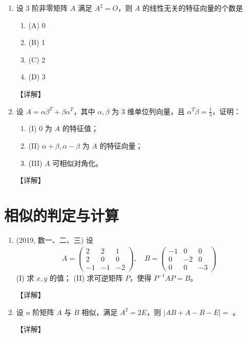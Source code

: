\documentclass[12pt, a4paper, oneside, UTF8]{ctexbook}
\begin{document}
\begin{enumerate}[label=\arabic*.]
    \item 设 3 阶非零矩阵 $A$ 满足 $A^2 = O$，则 $A$ 的线性无关的特征向量的个数是
    \begin{enumerate}
        \item (A) 0
        \item (B) 1
        \item (C) 2
        \item (D) 3
    \end{enumerate}
    
    \begin{solution}
    【详解】
    \end{solution}
    
    \item 设 $A = \alpha \beta^T + \beta \alpha^T$，其中 $\alpha, \beta$ 为 3 维单位列向量，且 $\alpha^T \beta = \frac{1}{3}$，证明：
    \begin{enumerate}
        \item (I) 0 为 $A$ 的特征值；
        \item (II) $\alpha + \beta, \alpha - \beta$ 为 $A$ 的特征向量；
        \item (III) $A$ 可相似对角化。
    \end{enumerate}
    
    \begin{solution}
    【详解】
    \end{solution}
\end{enumerate}

\section{相似的判定与计算}

\begin{enumerate}[label=\arabic*.,start=6]
    \item (2019, 数一、二、三) 设
    \begin{align*}
    A = \begin{pmatrix}
    2 & 2 & 1 \\
    2 & 0 & 0 \\
    -1 & -1 & -2
    \end{pmatrix}, \quad
    B = \begin{pmatrix}
    -1 & 0 & 0 \\
    0 & -2 & 0 \\
    0 & 0 & -3
    \end{pmatrix}
    \end{align*}
    (I) 求 $x, y$ 的值；
    (II) 求可逆矩阵 $P$，使得 $P^{-1}AP = B$。
    
    \begin{solution}
    【详解】
    \end{solution}
    
    \item 设 $n$ 阶矩阵 $A$ 与 $B$ 相似，满足 $A^2 = 2E$，则 $|AB + A - B - E| = $ \underline{\hspace{3cm}}。
    
    \begin{solution}
    【详解】
    \end{solution}
\end{enumerate}
\end{document}
